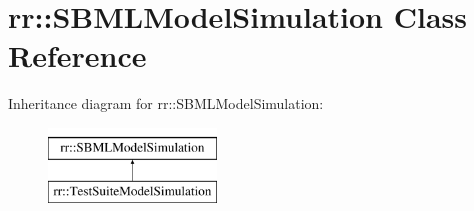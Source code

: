 \hypertarget{classrr_1_1_s_b_m_l_model_simulation}{\section{rr\-:\-:S\-B\-M\-L\-Model\-Simulation Class Reference}
\label{classrr_1_1_s_b_m_l_model_simulation}
}
Inheritance diagram for rr\-:\-:S\-B\-M\-L\-Model\-Simulation\-:\begin{figure}[H]
\begin{center}
\leavevmode
\includegraphics[height=2.000000cm]{classrr_1_1_s_b_m_l_model_simulation}
\end{center}
\end{figure}
